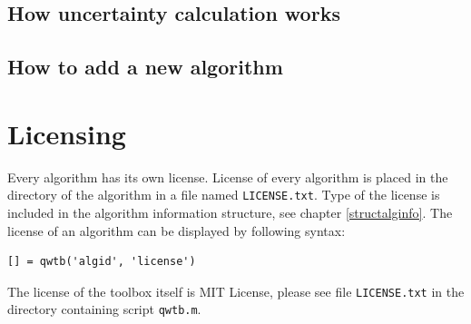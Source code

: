 \documentclass[12pt,a4paper,oneside]{report} %
\begin{document}
\section{How uncertainty calculation works} %

\section{How to add a new algorithm} %

\chapter{Licensing} %
\label{ch-license}
Every algorithm has its own license. License of every algorithm is placed in the directory of the
algorithm in a file named {\tt LICENSE.txt}. Type of the license is included in the algorithm information structure, see
chapter \ref{structalginfo}. The license of an algorithm can be displayed by following syntax:
\begin{lstlisting}
[] = qwtb('algid', 'license')
\end{lstlisting}

The license of the toolbox itself is MIT License, please see file {\tt LICENSE.txt} in the directory
containing script {\tt qwtb.m}.

\printbibliography[title={Bilbiography},heading={bibnumbered}]
\end{document}
